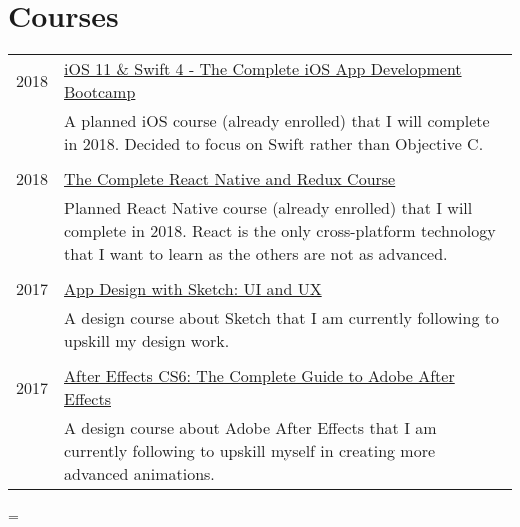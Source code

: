 \documentclass[a4paper,10pt,notitlepage]{article}
\newenvironment{absolutelynopagebreak}
  {\par\nobreak\vfil\penalty0\vfilneg
   \vtop\bgroup}
  {\par\xdef\tpd{\the\prevdepth}\egroup
   \prevdepth=\tpd}
\begin{document}
\begin{absolutelynopagebreak}
	
	\section{Courses}
	\begin{tabular}{r|p{11cm}}
	
		\textsc{2018} &                                                                                                                  
		\href{https://www.udemy.com/ios-11-app-development-bootcamp/learn/v4/overview}{iOS 11 \& Swift 4 - The Complete iOS App Development Bootcamp}\\&\footnotesize{A planned iOS course (already enrolled) that I will complete in 2018. Decided to focus on Swift rather than Objective C.} \\
		
		\multicolumn{2}{c}{} \\
		\textsc{2018} &                                                                                                                  
		\href{https://www.udemy.com/the-complete-react-native-and-redux-course/learn/v4/overview}{The Complete React Native and Redux Course}\\&\footnotesize{Planned React Native course (already enrolled) that I will complete in 2018. React is the only cross-platform technology that I want to learn as the others are not as advanced.} \\
		
		\multicolumn{2}{c}{} \\
		\textsc{2017} &                                                                                                                  
		\href{https://www.udemy.com/app-design-with-sketch-ui-and-ux/}{App Design with Sketch: UI and UX}\\&\footnotesize{A design course about Sketch that I am currently following to upskill my design work.} \\
		
		\multicolumn{2}{c}{} \\
		\textsc{2017} &                                                                                                                  
		\href{https://www.udemy.com/aftereffects/}{After Effects CS6: The Complete Guide to Adobe After Effects}\\&\footnotesize{A design course about Adobe After Effects that I am currently following to upskill myself in creating more advanced animations.} \\
		

\end{tabular}
\end{absolutelynopagebreak}
\end{document}
